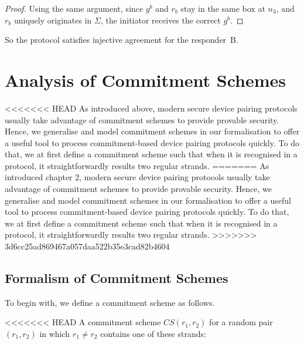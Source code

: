 \begin{itemize}
\begin{proof}
Using the same argument, since $g^b$ and $r_b$ stay in the same box at $n_3$, and $r_b$ uniquely originates in $\Sigma$, the initiator receives the correct $g^b$.
\end{proof}

So the protocol satisfies injective agreement for the responder~B. 

\section{Analysis of Commitment Schemes}

<<<<<<< HEAD
As introduced above, modern secure device pairing protocols usually take advantage of commitment schemes to provide provable security. Hence, we generalise and model commitment schemes in our formalisation to offer a useful tool to process commitment-based device pairing protocols quickly. To do that, we at first define a commitment scheme such that when it is recognised in a protocol, it straightforwardly results two regular strands. 
=======
As introduced chapter 2, modern secure device pairing protocols usually take advantage of commitment schemes to provide provable security. Hence, we generalise and model commitment schemes in our formalisation to offer a useful tool to process commitment-based device pairing protocols quickly. To do that, we at first define a commitment scheme such that when it is recognised in a protocol, it straightforwardly results two regular strands. 
>>>>>>> 3d6cc25ad869467a057daa522b35e3cad82b4604

\subsection{Formalism of Commitment Schemes}

To begin with, we define a commitment scheme as follows. 
 
\begin{Definition}
<<<<<<< HEAD
A commitment scheme $CS(r_1,r_2)$ for a random pair $(r_1,r_2)$ in which $r_1 \not= r_2$ contains one of these strands:
\end{Definition}


\end{itemize}
